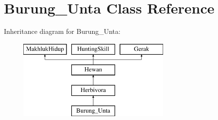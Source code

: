 \hypertarget{class_burung___unta}{}\section{Burung\+\_\+\+Unta Class Reference}
\label{class_burung___unta}
Inheritance diagram for Burung\+\_\+\+Unta\+:\begin{figure}[H]
\begin{center}
\leavevmode
\includegraphics[height=4.000000cm]{class_burung___unta}
\end{center}
\end{figure}

